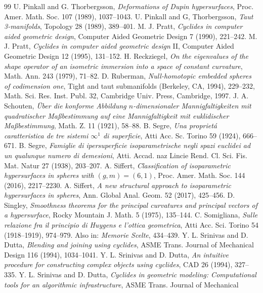 \documentclass[12pt]{article}
\begin{document}
{\begin{thebibliography}{99}
U. Pinkall and G. Thorbergsson, {\em Deformations
of Dupin hypersurfaces}, Proc. Amer. Math. Soc. 107 (1989), 1037--1043.
 U. Pinkall and G, Thorbergsson, {\em Taut 3-manifolds},
Topology 28 (1989), 389--401.
 M. J. Pratt,
{\em Cyclides in computer aided geometric design}, Computer
Aided Geometric Design 7 (1990), 221--242.
 M. J. Pratt,
{\em Cyclides in computer aided geometric design} II, Computer
Aided Geometric Design 12 (1995), 131--152.
H. Reckziegel, {\em On the eigenvalues of the shape
operator of an isometric immersion into a space of constant curvature},
Math. Ann. 243 (1979), 71--82.
 D. Ruberman, {\em Null-homotopic embedded spheres of codimension one}, Tight and taut submanifolds (Berkeley, CA, 1994), 229--232, Math. Sci. Res. Inst. Publ. 32,
Cambridge Univ. Press, Cambridge, 1997.
 J. A. Schouten, {\em \"{U}ber die konforme Abbildung
$n$-dimensionaler Mannigfaltigkeiten mit quadratischer
Ma\ss{}bestimmung auf eine Mannigfaltigkeit mit euklidischer
Ma\ss{}bestimmung}, Math. Z. 11 (1921), 58--88.
 B. Segre, {\em Una propriet\'{a} caratteristica de tre sistemi $\infty^1$ di superficie}, Atti Acc. Sc. 
Torino  59 (1924), 666--671.
B. Segre, {\em Famiglie di ipersuperficie
isoparametrische negli spazi euclidei ad un qualunque numero
di demesioni}, Atti. Accad. naz Lincie Rend. Cl. Sci. Fis.
Mat. Natur 27 (1938), 203--207.
 A. Siffert, {\em Classification of isoparametric hypersurfaces in spheres with $(g,m) = (6,1)$}, Proc. Amer. Math. Soc. 144
(2016), 2217--2230.
 A. Siffert, {\em A new structural approach to isoparametric hypersurfaces in spheres}, Ann. Global Anal. Geom. 52 (2017), 425--456.
 D. Singley, {\em Smoothness theorems for the principal
curvatures and principal vectors of a hypersurface}, Rocky
Mountain J. Math. 5 (1975), 135--144.
 C. Somigliana, {\em Sulle relazione fra il principio di Huygens e l'ottica geometrica}, Atti Acc. Sci. Torino
 54 (1918--1919), 974--979.  Also in: {\em Memorie Scelte}, 434--439.
 Y. L. Srinivas and D. Dutta,
{\em Blending and joining using cyclides}, ASME Trans. Journal of
Mechanical Design 116 (1994), 1034--1041.
 Y. L. Srinivas and D. Dutta,
{\em An intuitive procedure for constructing complex objects using
cyclides}, CAD 26 (1994), 327--335.
 Y. L. Srinivas and D. Dutta,
{\em Cyclides in geometric modeling: Computational tools for
an algorithmic infrastructure}, ASME Trans. Journal of Mechanical

\end{thebibliography}}
\end{document}
